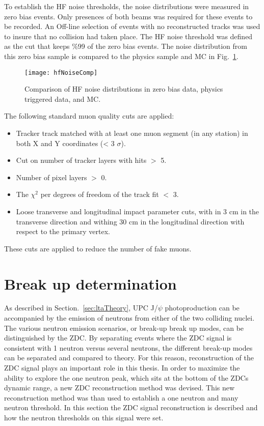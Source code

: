       To establish the HF noise thresholds, the noise distributions were 
        measured in zero bias events. 
      Only presences of both beams was required for these events to be recorded. 
      An Off-line selection of events with no reconstructed tracks was used
        to insure that no collision had taken place. 
      The HF noise threshold was defined as the cut that keeps \%99 of the 
        zero bias events.
      The noise distribution from this zero bias sample is compared to the 
        physics sample and MC in Fig.~\ref{fig:hfNoiseDist}.

      \begin{figure}[!Hhbt]
        \centering
        \texttt{[image: hfNoiseComp]}
        \caption{Comparison of HF noise distributions in zero bias data, 
          physics triggered data, and MC.}
        \label{fig:hfNoiseDist}
      \end{figure}

      The following standard muon quality cuts are applied:
      \begin{itemize}
        \item Tracker track matched with at least one muon segment 
          (in any station) in both X and Y coordinates (< 3 $\sigma$).
        \item Cut on number of tracker layers with hits $>$ 5.
        \item Number of pixel layers $>$ 0.
        \item The $\chi^{2}$ per degrees of freedom of the track fit $<$ 3. 
        \item Loose transverse and longitudinal impact parameter cuts, with in 3 
          cm in the transverse direction and withing 30 cm in the longitudinal 
          direction with respect to the primary vertex.
      \end{itemize}
      These cuts are applied to reduce the number of fake muons.
  
  \section{\label{sec:breakUpDet} Break up determination}
    As described in Section.~\ref{sec:ltaTheory}, UPC J/$\psi$ photoproduction 
      can be accompanied by the emission of neutrons from either of the two 
      colliding nuclei.
    The various neutron emission scenarios, or break-up break up modes, can 
      be distinguished by the ZDC.
    By separating events where the ZDC signal is consistent with 1 neutron 
      versus several neutrons, the different break-up modes can be separated
      and compared to theory. 
    For this reason, reconstruction of the ZDC signal plays an important role 
      in this thesis. 
    In order to maximize the ability to explore the one neutron peak, which 
      sits at the bottom of the ZDCs dynamic range, a new ZDC reconstruction 
      method was devised. 
    This new reconstruction method was than used to establish a one neutron and
      many neutron threshold.
    In this section the ZDC signal reconstruction is described and how the 
      neutron thresholds on this signal were set.
    
